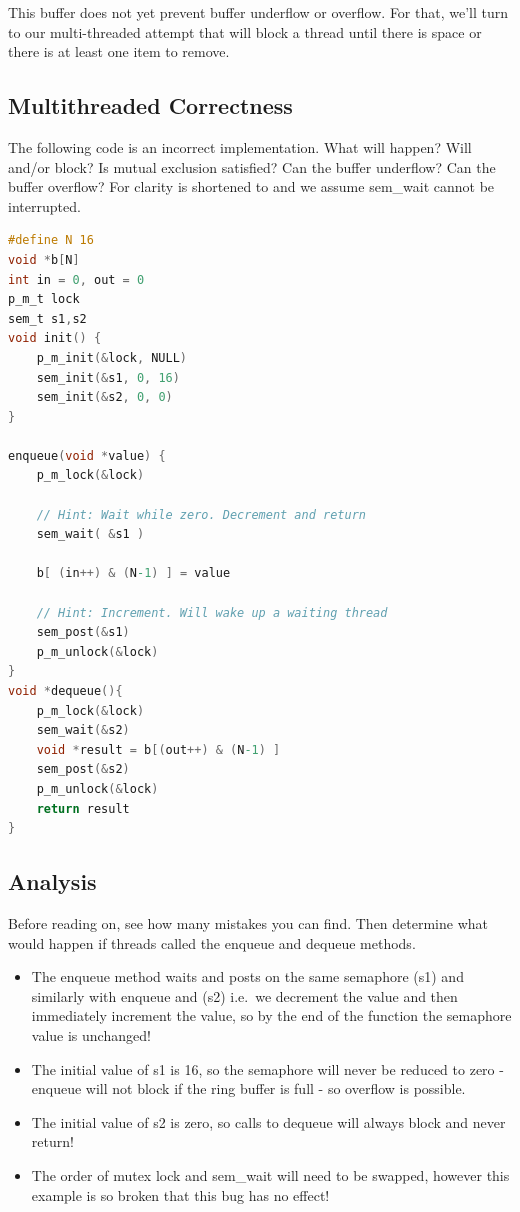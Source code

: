 This buffer does not yet prevent buffer underflow or overflow.
For that, we'll turn to our multi-threaded attempt that will block a thread until there is space or there is at least one item to remove.

\subsection{Multithreaded Correctness}

The following code is an incorrect implementation.
What will happen?
Will  and/or  block?
Is mutual exclusion satisfied?
Can the buffer underflow?
Can the buffer overflow?
For clarity  is shortened to  and we assume sem\_wait cannot be interrupted.

\begin{lstlisting}[language=C]
#define N 16
void *b[N]
int in = 0, out = 0
p_m_t lock
sem_t s1,s2
void init() {
    p_m_init(&lock, NULL)
    sem_init(&s1, 0, 16)
    sem_init(&s2, 0, 0)
}

enqueue(void *value) {
    p_m_lock(&lock)

    // Hint: Wait while zero. Decrement and return
    sem_wait( &s1 )

    b[ (in++) & (N-1) ] = value

    // Hint: Increment. Will wake up a waiting thread
    sem_post(&s1)
    p_m_unlock(&lock)
}
void *dequeue(){
    p_m_lock(&lock)
    sem_wait(&s2)
    void *result = b[(out++) & (N-1) ]
    sem_post(&s2)
    p_m_unlock(&lock)
    return result
}
\end{lstlisting}

\subsection{Analysis}

Before reading on, see how many mistakes you can find. Then determine what would happen if threads called the enqueue and dequeue methods.

\begin{itemize}
\tightlist
\item
  The enqueue method waits and posts on the same semaphore (s1) and similarly with enqueue and (s2) i.e.~we decrement the value and then immediately increment the value, so by the end of the function the semaphore value is unchanged!
\item
  The initial value of s1 is 16, so the semaphore will never be reduced to zero - enqueue will not block if the ring buffer is full - so overflow is possible.
\item
  The initial value of s2 is zero, so calls to dequeue will always block and never return!
\item
  The order of mutex lock and sem\_wait will need to be swapped, however this example is so broken that this bug has no effect!
\end{itemize}

